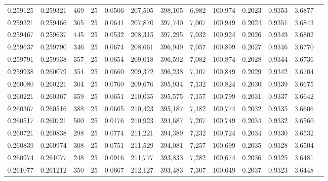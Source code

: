 \begin{tabular}{rrrrrrrrrrrrr}
0.259125 & 0.259321 &   469 &  25 &                                     0.0506 & 207,505 & 398,105 &   6,982 & 100,974 & 0.2023 & 0.9353 & 3.6877 \\
0.259321 & 0.259466 &   365 &  25 &                                     0.0641 & 207,870 & 397,740 &   7,007 & 100,949 & 0.2024 & 0.9351 & 3.6843 \\
0.259467 & 0.259637 &   445 &  25 &                                     0.0532 & 208,315 & 397,295 &   7,032 & 100,924 & 0.2026 & 0.9349 & 3.6802 \\
0.259637 & 0.259790 &   346 &  25 &                                     0.0674 & 208,661 & 396,949 &   7,057 & 100,899 & 0.2027 & 0.9346 & 3.6770 \\
0.259791 & 0.259938 &   357 &  25 &                                     0.0654 & 209,018 & 396,592 &   7,082 & 100,874 & 0.2028 & 0.9344 & 3.6736 \\
0.259938 & 0.260079 &   354 &  25 &                                     0.0660 & 209,372 & 396,238 &   7,107 & 100,849 & 0.2029 & 0.9342 & 3.6704 \\
0.260080 & 0.260221 &   304 &  25 &                                     0.0760 & 209,676 & 395,934 &   7,132 & 100,824 & 0.2030 & 0.9339 & 3.6675 \\
0.260221 & 0.260367 &   359 &  25 &                                     0.0651 & 210,035 & 395,575 &   7,157 & 100,799 & 0.2031 & 0.9337 & 3.6642 \\
0.260367 & 0.260516 &   388 &  25 &                                     0.0605 & 210,423 & 395,187 &   7,182 & 100,774 & 0.2032 & 0.9335 & 3.6606 \\
0.260517 & 0.260721 &   500 &  25 &                                     0.0476 & 210,923 & 394,687 &   7,207 & 100,749 & 0.2034 & 0.9332 & 3.6560 \\
0.260721 & 0.260838 &   298 &  25 &                                     0.0774 & 211,221 & 394,389 &   7,232 & 100,724 & 0.2034 & 0.9330 & 3.6532 \\
0.260839 & 0.260974 &   308 &  25 &                                     0.0751 & 211,529 & 394,081 &   7,257 & 100,699 & 0.2035 & 0.9328 & 3.6504 \\
0.260974 & 0.261077 &   248 &  25 &                                     0.0916 & 211,777 & 393,833 &   7,282 & 100,674 & 0.2036 & 0.9325 & 3.6481 \\
0.261077 & 0.261212 &   350 &  25 &                                     0.0667 & 212,127 & 393,483 &   7,307 & 100,649 & 0.2037 & 0.9323 & 3.6448 \\

\end{tabular}
